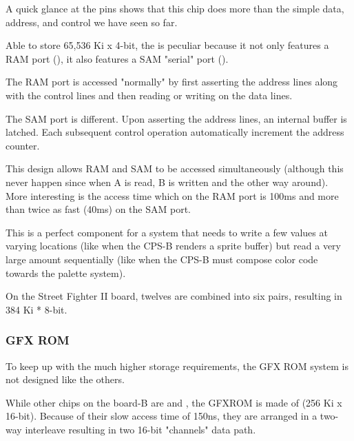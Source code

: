 A quick glance at the  pins shows that this chip does more than the simple data, address, and control we have seen so far.


Able to store 65,536 Ki x 4-bit, the  is peculiar because it not only features a RAM port (), it also features a SAM "serial" port ().
 
The RAM port is accessed "normally" by first asserting the address lines along with the control lines and then reading or writing on the data lines.

The SAM port is different. Upon asserting the address lines, an internal buffer is latched. Each subsequent control operation automatically increment the address counter.

This design allows RAM and SAM to be accessed simultaneously (although this never happen since when A is read, B is written and the other way around).
 More interesting is the access time which on the RAM port is 100ms and more than twice as fast (40ms) on the SAM port. 

 This is a perfect component for a system that needs to write a few values at varying locations (like when the CPS-B renders a sprite buffer) but read a very large amount sequentially (like when the CPS-B must compose color code towards the palette system).

 On the Street Fighter II board, twelves  are combined into six pairs, resulting in 384 Ki * 8-bit.







\subsubsection{GFX ROM}
To keep up with the much higher storage requirements, the GFX ROM system is not designed like the others. 

While other chips on the board-B are  and , the GFXROM is made of  (256 Ki x 16-bit). Because of their slow access time of 150ns, they are arranged in a two-way interleave resulting in two 16-bit "channels" data path.


